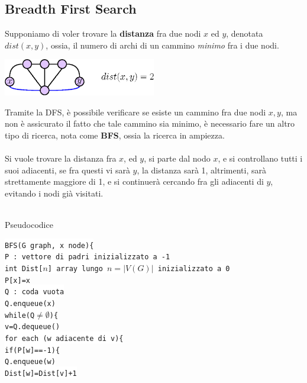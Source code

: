 \documentclass[12pt, letterpaper]{article}
\newcommand{\codee}[1]{\colorbox{white}{\texttt{#1}}}
\newcommand{\acc}{\\\hphantom{}\\}
\begin{document}
\subsection{Breadth First Search}
Supponiamo di voler trovare la \textbf{distanza} fra due nodi $x$ ed $y$, denotata $dist(x,y)$, ossia, il numero di archi di un 
cammino \textit{minimo} fra i due nodi.\begin{center}
    \includegraphics[width=0.5\textwidth ]{images/dist.eps}
\end{center} 
Tramite la DFS, è possibile verificare se esiste un cammino fra  due nodi $x,y$, ma non è assicurato il fatto che tale 
cammino sia minimo, è necessario fare un altro tipo di ricerca, nota come  \textbf{BFS}, ossia la ricerca in ampiezza.\acc 
Si vuole trovare la distanza fra $x$, ed $y$, si parte dal nodo $x$, e si controllano tutti i suoi adiacenti, se fra questi 
vi sarà $y$, la distanza sarà 1, altrimenti, sarà strettamente maggiore di 1, e si continuerà cercando fra gli adiacenti 
di $y$, evitando i nodi già visitati. \acc 
\begin{center}
    Pseudocodice
\end{center}
\codee{BFS(G graph, x node)\{}\\
\hphantom{ident}\codee{P : vettore di padri inizializzato a -1}\\
\hphantom{ident}\codee{int Dist[$n$] array lungo $n=|V(G)|$ inizializzato a 0}\\
\hphantom{ident}\codee{P[x]=x}\\
\hphantom{ident}\codee{Q : coda vuota}\\
\hphantom{ident}\codee{Q.enqueue(x)}\\
\hphantom{ident}\codee{while(Q$\ne\emptyset$)\{}\\
\hphantom{ident}\hphantom{ident}\codee{v=Q.dequeue()}\\
\hphantom{ident}\hphantom{ident}\codee{for each (w adiacente di v)\{}\\
\hphantom{ident}\hphantom{ident}\hphantom{ident}\codee{if(P[w]==-1)\{}\\
\hphantom{ident}\hphantom{ident}\hphantom{ident}\hphantom{ident}\codee{Q.enqueue(w)}\\
\hphantom{ident}\hphantom{ident}\hphantom{ident}\hphantom{ident}\codee{Dist[w]=Dist[v]+1}\\
\end{document}
